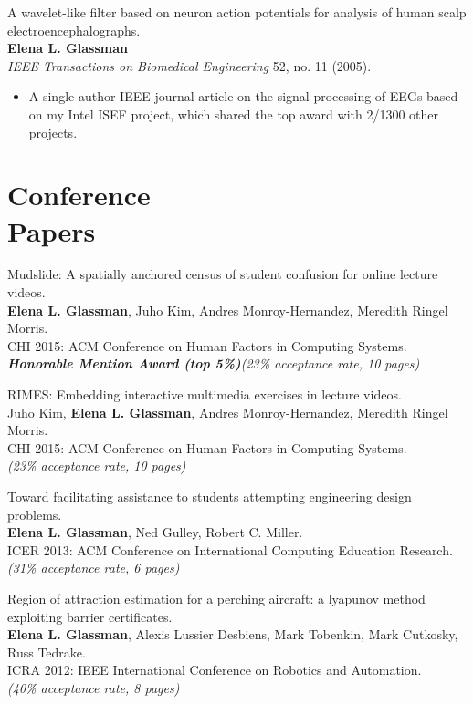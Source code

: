 \documentclass[margin]{res}
\begin{document}
\begin{resume}
\newpage

A wavelet-like filter based on neuron action potentials for analysis of human scalp electroencephalographs.\\ 
{\bf Elena L. Glassman}\\
\textit{IEEE Transactions on Biomedical Engineering} 52, no. 11 (2005).
\begin{itemize} \itemsep -2pt  %
\item A single-author IEEE journal article on the signal processing of EEGs based on my Intel ISEF project, which shared the top award with 2/1300 other projects. 
\end{itemize}

\section{Conference\\ Papers}

Mudslide: A spatially anchored census of student confusion for online lecture videos.\\
{\bf Elena L. Glassman}, Juho Kim, Andres Monroy-Hernandez, Meredith Ringel Morris.\\
CHI 2015: ACM Conference on Human Factors in Computing Systems.\\
\textbf{\emph{Honorable Mention Award (top 5\%)}}{\it (23\% acceptance rate, 10 pages)}

RIMES: Embedding interactive multimedia exercises in lecture videos.\\
Juho Kim, {\bf Elena L. Glassman}, Andres Monroy-Hernandez, Meredith Ringel Morris. \\
CHI 2015: ACM Conference on Human Factors in Computing Systems.\\
{\it (23\% acceptance rate, 10 pages)}

Toward facilitating assistance to students attempting engineering design problems.\\
{\bf Elena L. Glassman}, Ned Gulley, Robert C. Miller. \\
ICER 2013: ACM Conference on International Computing Education Research.\\
{\it (31\% acceptance rate, 6 pages)}

Region of attraction estimation for a perching aircraft: a lyapunov method exploiting barrier certificates.\\
{\bf Elena L. Glassman}, Alexis Lussier Desbiens, Mark Tobenkin, Mark Cutkosky, Russ Tedrake.\\
ICRA 2012: IEEE International Conference on Robotics and Automation.\\
{\it (40\% acceptance rate, 8 pages)}


\end{resume}
\end{document}
